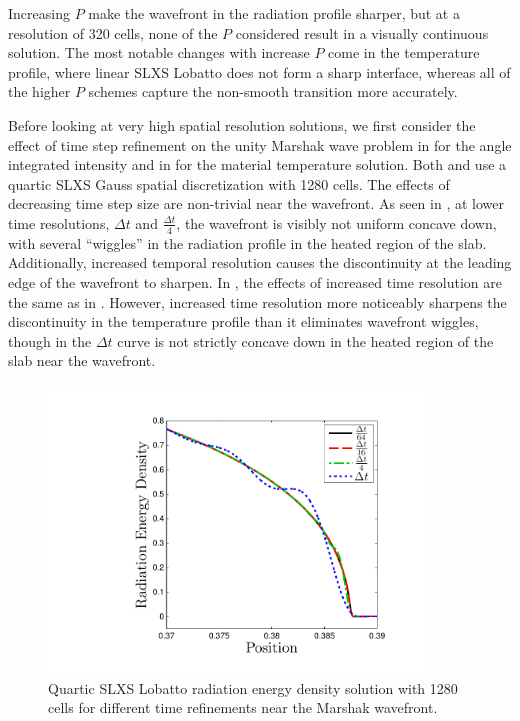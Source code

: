 Increasing $P$ make the wavefront in the radiation profile sharper, but at a resolution of 320 cells, none of the $P$ considered result in a visually continuous solution.
The most notable changes with increase $P$ come in the temperature profile, where linear SLXS Lobatto does not form a sharp interface, whereas all of the higher $P$ schemes capture the non-smooth transition more accurately.

Before looking at very high spatial resolution solutions, we first consider the effect of time step refinement on the unity Marshak wave problem in  for the angle integrated intensity and in  for the material temperature solution.
Both  and  use a quartic SLXS Gauss spatial discretization with 1280 cells.
The effects of decreasing time step size are non-trivial near the wavefront.
As seen in , at lower time resolutions, $\Delta t$ and $\frac{\Delta t}{4}$, the wavefront is visibly not uniform concave down, with several ``wiggles'' in the radiation profile in the heated region of the slab.
Additionally, increased temporal resolution causes the discontinuity at the leading edge of the wavefront to sharpen.
In , the effects of increased time resolution are the same as in .
However, increased time resolution more noticeably sharpens the discontinuity in the temperature profile than it eliminates wavefront wiggles, though in  the $\Delta t$ curve is not strictly concave down in the heated region of the slab near the wavefront.
%
%
\begin{figure}[!htp]
\centering
\includegraphics[width=10cm,trim=1.0in  0.2in 0.5in 0.5in,clip=true]{chapter6_grey_radtran/Dissertation_Data/Time_Refinement_Zoom_Radiation.pdf}
\caption{Quartic SLXS Lobatto radiation energy density solution with 1280 cells for different time refinements near the Marshak wavefront.}
\label{fig:time_refinement_rad}
\end{figure}
